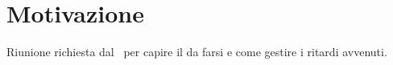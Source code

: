 \documentclass[../template.tex]{subfiles}
\begin{document}
\section{Motivazione}
Riunione richiesta dal \responsabilediprogetto\ per capire il da farsi e come gestire i ritardi avvenuti.
\end{document}

